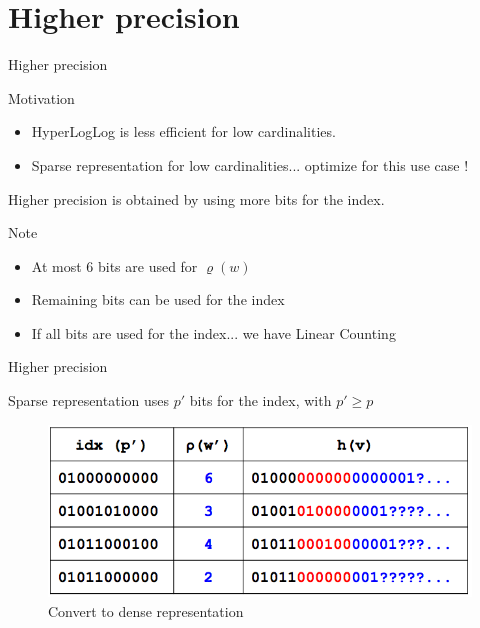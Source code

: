 \documentclass{beamer}
\begin{document}


\section{Higher precision}
\begin{frame}{Higher precision}

  \begin{block}{Motivation}
    \begin{itemize}
      \item HyperLogLog is less efficient for low cardinalities. 
      \item Sparse representation for low cardinalities... optimize for this use case !
    \end{itemize}
  \end{block}

  Higher precision is obtained by using more bits for the index. 

  \begin{block}{Note}
    \begin{itemize} 
      \item At most 6 bits are used for $\varrho(w)$
      \item Remaining bits can be used for the index
      \item If all bits are used for the index... we have Linear Counting
    \end{itemize}
  \end{block}

\end{frame}



\begin{frame}{Higher precision}




Sparse representation uses $p \prime$ bits for the index, with $p \prime \ge p$

\begin{figure}[c]
\includegraphics[scale=0.45]{hyperloglog_prime_to_p.png}
\caption{Convert to dense representation}
\end{figure}

\end{frame}
\end{document}
